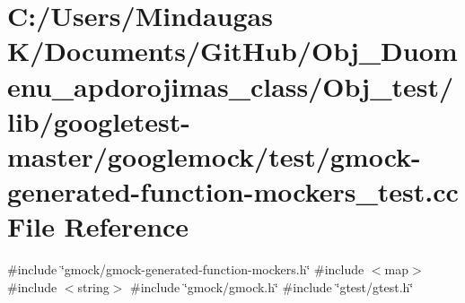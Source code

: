\hypertarget{_obj__test_2lib_2googletest-master_2googlemock_2test_2gmock-generated-function-mockers__test_8cc}{}\section{C\+:/\+Users/\+Mindaugas K/\+Documents/\+Git\+Hub/\+Obj\+\_\+\+Duomenu\+\_\+apdorojimas\+\_\+class/\+Obj\+\_\+test/lib/googletest-\/master/googlemock/test/gmock-\/generated-\/function-\/mockers\+\_\+test.cc File Reference}
\label{_obj__test_2lib_2googletest-master_2googlemock_2test_2gmock-generated-function-mockers__test_8cc}
{\ttfamily \#include \char`\"{}gmock/gmock-\/generated-\/function-\/mockers.\+h\char`\"{}}\newline
{\ttfamily \#include $<$map$>$}\newline
{\ttfamily \#include $<$string$>$}\newline
{\ttfamily \#include \char`\"{}gmock/gmock.\+h\char`\"{}}\newline
{\ttfamily \#include \char`\"{}gtest/gtest.\+h\char`\"{}}\newline
